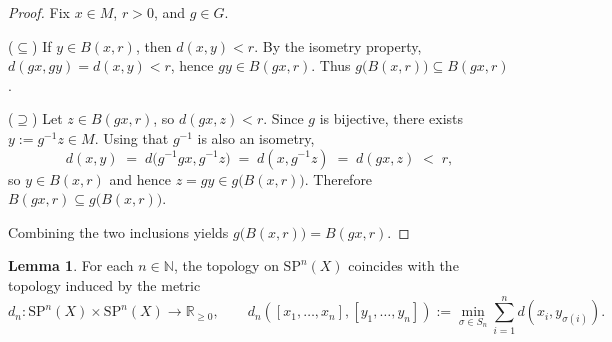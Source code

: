 \documentclass[10pt,a4paper]{article}
\theoremstyle{definition}
\newtheorem{lemma}[theorem]{Lemma}
\newcommand{\SP}{\mathrm{SP}}
\newcommand{\R}{\mathbb{R}}
\newcommand{\N}{\mathbb{N}}
\begin{document}
\begin{proof}
Fix $x\in M$, $r>0$, and $g\in G$. 

\smallskip\noindent
($\subseteq$) If $y\in B(x,r)$, then $d(x,y)<r$. By the isometry property,
$d(gx,gy)=d(x,y)<r$, hence $gy\in B(gx,r)$. Thus $g\bigl(B(x,r)\bigr)
\subseteq B(gx,r)$.

\smallskip\noindent
($\supseteq$) Let $z\in B(gx,r)$, so $d(gx,z)<r$. Since $g$ is bijective, there
exists $y:=g^{-1}z\in M$. Using that $g^{-1}$ is also an isometry,
\[
d(x,y)\;=\;d\bigl(g^{-1}gx,g^{-1}z\bigr)\;=\;d(x,g^{-1}z)\;=\;d(gx,z)\;<\;r,
\]
so $y\in B(x,r)$ and hence $z=gy\in g\bigl(B(x,r)\bigr)$. Therefore
$B(gx,r)\subseteq g\bigl(B(x,r)\bigr)$.

Combining the two inclusions yields $g\bigl(B(x,r)\bigr)=B(gx,r)$.
\end{proof}


\begin{lemma}\label{lem:top_equal_SPn}
For each $n \in \N$, the topology on $\SP^{n}(X)$ coincides with the topology
induced by the metric
\[
d_{n} \colon \SP^{n}(X) \times \SP^{n}(X) \longrightarrow \R_{\ge 0},
\qquad
d_{n}([x_1,\ldots,x_n],[y_1,\ldots,y_n])
:= \min_{\sigma \in S_n}
\sum_{i=1}^{n} d(x_i,y_{\sigma(i)}).
\]
\end{lemma}
\end{document}
